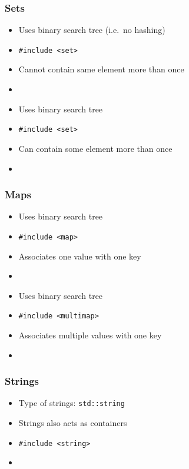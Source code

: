 \begin{frame}
  \frametitle{Sets}
  \begin{itemize}
    \item Uses binary search tree (i.e.~no hashing)
    \item \texttt{\#include <set>}
    \item Cannot contain same element more than once
    \item {}
  \end{itemize}
  \vskip5mm
  \begin{itemize}
    \item Uses binary search tree
    \item \texttt{\#include <set>}
    \item Can contain some element more than once
    \item {}
  \end{itemize}
\end{frame}

\begin{frame}
  \frametitle{Maps}
  \begin{itemize}
    \item Uses binary search tree
    \item \texttt{\#include <map>}
    \item Associates one value with one key
    \item {}
  \end{itemize}
  \vskip5mm
  \begin{itemize}
    \item Uses binary search tree
    \item \texttt{\#include <multimap>}
    \item Associates multiple values with one key
    \item {}
  \end{itemize}
\end{frame}

\begin{frame}
  \frametitle{Strings}
  \begin{itemize}
    \item Type of strings: \texttt{std::string}
    \item Strings also acts as containers
    \item \texttt{\#include <string>}
    \item {}
  \end{itemize}
\end{frame}


